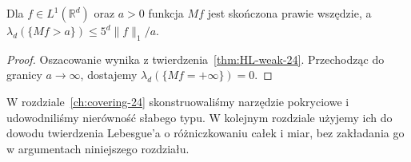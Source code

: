 \begin{wniosek}
\label{cor:HL-level-24}
Dla $f\in L^1(\mathbb R^d)$ oraz $a>0$ funkcja $Mf$
jest skończona prawie wszędzie, a
$\lambda_d(\{Mf>a\})\le5^d\|f\|_1/a$.
\end{wniosek}
\begin{proof}
Oszacowanie wynika z twierdzenia~\ref{thm:HL-weak-24}.
Przechodząc do granicy $a\to\infty$, dostajemy
$\lambda_d(\{Mf=+\infty\})=0$.
\end{proof}

\begin{uwaga}
W rozdziale~\ref{ch:covering-24} skonstruowaliśmy narzędzie
pokryciowe i udowodniliśmy nierówność słabego typu.
W kolejnym rozdziale użyjemy ich do dowodu twierdzenia
Lebesgue'a o różniczkowaniu całek i miar, bez zakładania
go w argumentach niniejszego rozdziału.
\end{uwaga}
